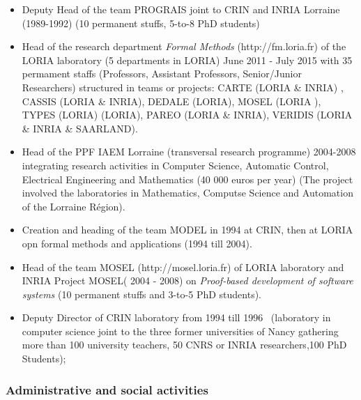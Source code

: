 \documentclass[ 12pt]{article}
\begin{document}
\begin{itemize}


\item Deputy Head of the team  PROGRAIS  joint to CRIN  and INRIA Lorraine (1989-1992) (10 permanent stuffs, 5-to-8 PhD students)

\item Head of the research department   \textit{Formal Methods}
  (http://fm.loria.fr) of the LORIA laboratory (5 departments in LORIA)     June 2011 - July 2015  with  35 permament staffs (Professors, Assistant Professors, Senior/Junior Researchers)  structured in  teams or projects: CARTE (LORIA \& INRIA) , CASSIS  (LORIA \& INRIA), DEDALE (LORIA), MOSEL (LORIA ), TYPES (LORIA)  (LORIA), PAREO  (LORIA \& INRIA), VERIDIS (LORIA \& INRIA \& SAARLAND). 

\item Head of the  PPF IAEM Lorraine (transversal research programme)  2004-2008 integrating  research activities in Computer Science, Automatic Control, Electrical Engineering  and Mathematics  (40 000 euros per year) (The project involved the laboratories in Mathematics, Computse Science and Automation of the Lorraine R\'egion). 

\item Creation and heading of the team  MODEL  in  1994 at  CRIN, then at  LORIA opn formal methods and applications (1994 till 2004).

\item Head of the team  MOSEL (http://mosel.loria.fr) of LORIA laboratory  and INRIA Project   MOSEL( 2004 -  2008) on  \textit{Proof-based development of software systems} (10 permanent stuffs and 3-to-5 PhD students).

\item Deputy Director of CRIN laboratory from  1994 till  1996~ (laboratory in computer science  joint to the three former universities of Nancy gathering more than 100 university teachers, 50 CNRS or INRIA researchers,100 PhD Students);



\end{itemize}


\subsubsection{Administrative and social activities}
\end{document}
